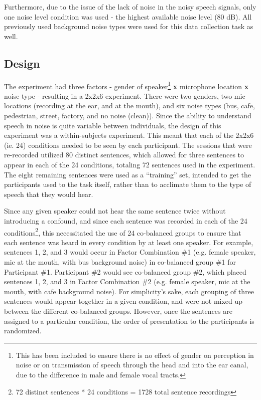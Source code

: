 \documentclass[dissertation,copyright]{uathesis}
\begin{document}
Furthermore, due to the issue of the lack of noise in the noisy speech signals, only one noise level condition was used - the highest available noise level (80 dB).  All previously used background noise types were used for this data collection task as well.


\subsection{Design}
\label{chap4:methods:design}

The experiment had three factors - gender of speaker\footnote{This has been included to ensure there is no effect of gender on perception in noise or on transmission of speech through the head and into the ear canal, due to the difference in male and female vocal tracts.} \textbf{x} microphone location \textbf{x} noise type - resulting in a 2x2x6 experiment.  There were two genders, two mic locations (recording at the ear, and at the mouth), and six noise types (bus, cafe, pedestrian, street, factory, and no noise (clean)).  Since the ability to understand speech in noise is quite variable between individuals, the design of this experiment was a within-subjects experiment.  This meant that each of the 2x2x6 (ie. 24) conditions needed to be seen by each participant.  The sessions that were re-recorded utilized 80 distinct sentences, which allowed for three sentences to appear in each of the 24 conditions, totaling 72 sentences used in the experiment.  The eight remaining sentences were used as a ``training'' set, intended to get the participants used to the task itself, rather than to acclimate them to the type of speech that they would hear.

Since any given speaker could not hear the same sentence twice without introducing a confound, and since each sentence was recorded in each of the 24 conditions\footnote{72 distinct sentences * 24 conditions = 1728 total sentence recordings}, this necessitated the use of 24 co-balanced groups to ensure that each sentence was heard in every condition by at least one speaker.  For example, sentences 1, 2, and 3 would occur in Factor Combination \#1 (e.g. female speaker, mic at the mouth, with bus background noise) in co-balanced group \#1 for Participant \#1. Participant \#2 would see co-balanced group \#2, which placed sentences 1, 2, and 3 in Factor Combination \#2 (e.g. female speaker, mic at the mouth, with cafe background noise).  For simplicity's sake, each grouping of three sentences would appear together in a given condition, and were not mixed up between the different co-balanced groups.  However, once the sentences are assigned to a particular condition, the order of presentation to the participants is randomized.
\end{document}
